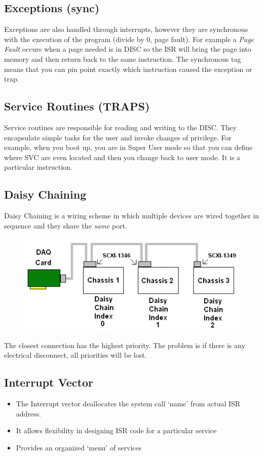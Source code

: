 \documentclass{hw}
\begin{document}
\subsection{Exceptions (sync)}
Exceptions are also handled through interrupts, however they are synchronous with
the execution of the program (divide by 0, page fault). For example a 
\emph{Page Fault} occurs when a page needed is in DISC so the ISR will bring the 
page into memory and then return back to the same instruction. The synchronous 
tag means that you can pin point exactly which instruction caused the exception
or trap.

\subsection{Service Routines (TRAPS)}
Service routines are responsible for reading and writing to the DISC\@.  They 
encapsulate simple tasks for the user and invoke changes of privilege. For example,
when you boot up, you are in Super User mode so that you can define where SVC are
even located and then you change back to user mode. It is a particular instruction.

\subsection{Daisy Chaining}
Daisy Chaining is a wiring scheme in which multiple devices are wired together 
in sequence and they share the \emph{same} port.
\begin{figure}[H]
  \centering
  \includegraphics[scale=.8]{img/dchain}
\end{figure}

The closest connection has the highest priority. The problem is if there is any
electrical disconnect, all priorities will be lost. 

\subsection{Interrupt Vector}
\begin{itemize}
  \item The Interrupt vector deallocates the system call `name' from actual ISR
    address.
  \item It allows flexibility in designing ISR code for a particular service
  \item Provides an organized `menu' of services
\end{itemize}
\end{document}
